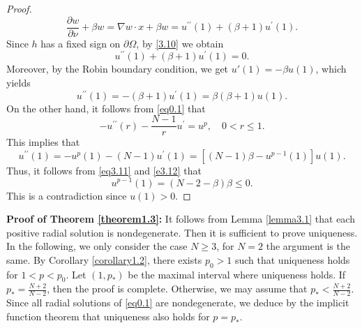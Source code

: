 \documentclass[12pt,reqno]{amsart}
\numberwithin{equation}{section}
\theoremstyle{definition}
\begin{document}
\begin{proof}
$$
\frac{\partial w}{\partial\nu}+\beta w=\nabla w\cdot x+\beta w=u^{\prime\prime}(1)+(\beta+1)u^\prime(1).
$$
Since $h$ has a fixed sign on $\partial\Omega$, by \eqref{3.10} we obtain  
\begin{equation*}
u^{\prime\prime}(1)+(\beta+1)u^\prime(1)=0.
\end{equation*}
Moreover, by the Robin boundary condition, we get $u'(1) = -\beta u(1)$, which yields 
\begin{equation}\label{eq3.11}
u^{\prime\prime}(1)=-(\beta+1)u^\prime(1)=\beta(\beta+1)u(1).
\end{equation}
On the other hand, it follows from \eqref{eq0.1} that 
$$
-u^{\prime\prime}(r)-\frac{N-1}{r}u^\prime=u^p,\quad 0<r\le 1.
$$
This implies that 
\begin{equation}\label{e3.12}
u^{\prime\prime}(1)=-u^p(1)-(N-1)u^\prime(1)=[(N-1)\beta-u^{p-1}(1)]u(1).
\end{equation}
Thus, it follows from \eqref{eq3.11} and \eqref{e3.12} that 
$$
u^{p-1}(1)=(N-2-\beta)\beta\le0.
$$
This is a contradiction since $u(1)>0$. 
\end{proof}


{\bf Proof of Theorem \ref{theorem1.3}:} It follows from Lemma \ref{lemma3.1} that 
each positive radial solution is nondegenerate. Then it is sufficient to prove uniqueness. In the following, we only consider the case $N\ge 3$, for $N=2$ the argument is the same. By Corollary \ref{corollary1.2}, there exists $p_0>1$ such that uniqueness holds for $1<p<p_0$. Let $(1,p_*)$ be the maximal interval where uniqueness holds. If $p_*=\frac{N+2}{N-2 }$, then the proof is complete. Otherwise, we may assume that $p_*<\frac{N+2}{N-2}$. Since all radial solutions of \eqref{eq0.1} are nondegenerate, we deduce by the implicit function theorem that uniqueness also holds for $p=p_*$.
\end{document}
